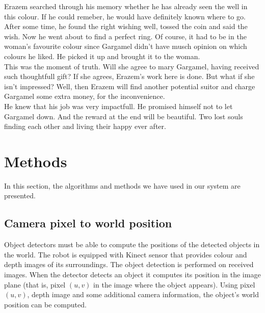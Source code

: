 \documentclass[12pt,a4paper]{article}
\begin{document}
	Erazem searched through his memory whether he has already seen the well in this colour. If he could remeber, he would have definitely known where to go. After some time, he found the right wishing well, tossed the coin and said the wish. Now he went about to find a perfect ring. Of course, it had to be in the woman's favourite colour since Gargamel didn't have musch opinion on which colours he liked. He picked it up and brought it to the woman. \\
	
	This was the moment of truth. Will she agree to mary Gargamel, having received such thoughtfull gift? If she agrees, Erazem's work here is done. But what if she isn't impressed? Well, then Erazem will find another potential suitor and charge Gargamel some extra money, for the inconvenience. \\

	He knew that his job was very impactfull. He promised himself not to let Gargamel down. And the reward at the end will be beautiful. Two lost souls finding each other and living their happy ever after.

	
	\section{Methods} \label{methods}
	In this section, the algorithms and methods we have used in our system are presented.

	
	\subsection{Camera pixel to world position} \label{pixel_to_world}
	Object detectors must be able to compute the positions of the detected objects in the world. The robot is equipped with Kinect sensor that provides colour and depth images of its surroundings. The object detection is performed on received images. When the detector detects an object it computes its position in the image plane (that is, pixel $(u, v)$ in the image where the object appears). Using pixel $(u, v)$, depth image and some additional camera information, the object's world position can be computed. \\
	
\end{document}

